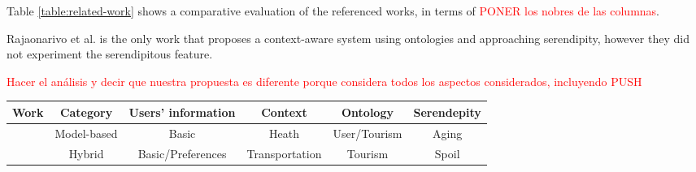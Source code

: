 Table \ref{table:related-work} shows a comparative evaluation  of the referenced works, in terms of \textcolor{red}{PONER los nobres de las columnas}. 

Rajaonarivo et al. \cite{rajaonarivo2019rec} is the only work that proposes a context-aware system using ontologies and approaching serendipity, however they did not experiment the serendipitous feature.

\textcolor{red}{Hacer el análisis y decir que nuestra propuesta es diferente porque considera todos los aspectos considerados, incluyendo PUSH}


\begin{table*}[h!]
    \centering
    \caption{Related work on recommender systems for e-tourism}
    \label{table:related-work}
    \begin{tabular}{|c|c|c|c|c|c|} 
        \hline
        \textbf{Work} & \textbf{Category} & \textbf{Users' information} & \textbf{Context}&\textbf{Ontology}&\textbf{Serendepity} \\\hline \hline 
        & Model-based  & Basic& Heath & User/Tourism & Aging\\    \hline
                &Hybrid &Basic/Preferences & Transportation& Tourism & Spoil \\    \hline
    \end{tabular}
    
    \end{table*}



